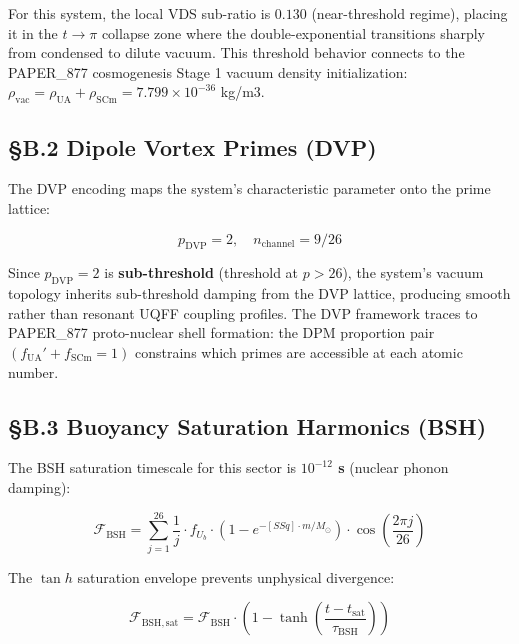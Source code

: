 \documentclass[12pt,a4paper]{article}
\begin{document}
For this system, the local VDS sub-ratio is $0.130$ (near-threshold regime), placing it in the $t \to \pi$ collapse zone where the double-exponential transitions sharply from condensed to dilute vacuum. This threshold behavior connects to the PAPER\_877 cosmogenesis Stage 1 vacuum density initialization: $\rho_{\mathrm{vac}} = \rho_{\mathrm{UA}} + \rho_{\mathrm{SCm}} = 7.799 \times 10^{-36}$ kg/m3.

\subsection{\S{}B.2 Dipole Vortex Primes (DVP)}

The DVP encoding maps the system's characteristic parameter onto the prime lattice:

\begin{equation}
p_{\mathrm{DVP}} = 2, \quad n_{\mathrm{channel}} = 9/26
\end{equation}

Since $p_{\mathrm{DVP}} = 2$ is \textbf{sub-threshold} (threshold at $p > 26$), the system's vacuum topology inherits sub-threshold damping from the DVP lattice, producing smooth rather than resonant UQFF coupling profiles. The DVP framework traces to PAPER\_877 proto-nuclear shell formation: the DPM proportion pair $(f_{\mathrm{UA}}' + f_{\mathrm{SCm}} = 1)$ constrains which primes are accessible at each atomic number.

\subsection{\S{}B.3 Buoyancy Saturation Harmonics (BSH)}

The BSH saturation timescale for this sector is \textbf{$10^{-12}$ s} (nuclear phonon damping):

\begin{equation}
\mathcal{F}_{\mathrm{BSH}} = \sum_{j=1}^{26} \frac{1}{j} \cdot f_U_b \cdot \left(1 - e^{-[SSq] \cdot m/M_\odot}\right) \cdot \cos\!\left(\frac{2\pi j}{26}\right)
\end{equation}

The $\tan h$ saturation envelope prevents unphysical divergence:

\begin{equation}
\mathcal{F}_{\mathrm{BSH,sat}} = \mathcal{F}_{\mathrm{BSH}} \cdot \left(1 - \tanh\!\left(\frac{t - t_{\mathrm{sat}}}{\tau_{\mathrm{BSH}}}\right)\right)
\end{equation}
\end{document}
